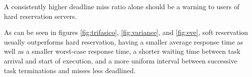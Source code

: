 \documentclass[times, 10pt,twocolumn]{article}
\begin{document}
\label{sec:conclusion}

A consistently higher deadline miss ratio alone should be a warning to
users of hard reservation servers.

As can be seen in figures \ref{fig:trifasico}, \ref{fig:variance}, and
\ref{fig:eve}, soft reservation usually outperforms hard reservation,
having a smaller average response time as well as a smaller worst-case
response time, a shorter waiting time between task arrival and start
of execution, and a more uniform interval between successive task
terminations and misses less deadlined.



\end{document}
